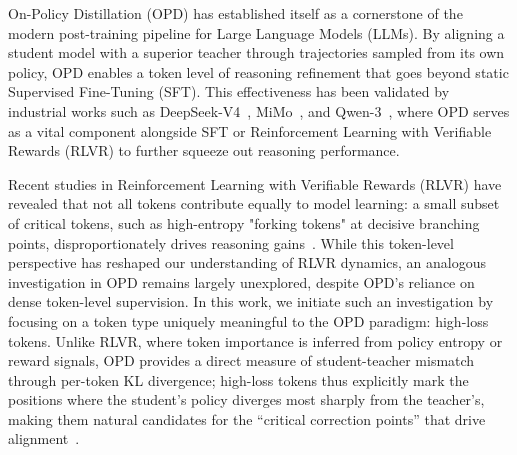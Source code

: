 
On-Policy Distillation (OPD) has established itself as a cornerstone of the modern post-training pipeline for Large Language Models (LLMs). By aligning a student model with a superior teacher through trajectories sampled from its own policy, OPD enables a token level of reasoning refinement that goes beyond static Supervised Fine-Tuning (SFT). This effectiveness has been validated by industrial works such as DeepSeek-V4~\cite{deepseekv4}, MiMo~\cite{xiao2026mimo}, and Qwen-3~\cite{qwen3technicalreport}, where OPD serves as a vital component alongside SFT or Reinforcement Learning with Verifiable Rewards (RLVR) to further squeeze out reasoning performance.



Recent studies in Reinforcement Learning with Verifiable Rewards (RLVR) have revealed that not all tokens contribute equally to model learning: a small subset of critical tokens, such as high-entropy "forking tokens" at decisive branching points, disproportionately drives reasoning gains~\cite{wang2025beyond}. While this token-level perspective has reshaped our understanding of RLVR dynamics, an analogous investigation in OPD remains largely unexplored, despite OPD's reliance on dense token-level supervision. In this work, we initiate such an investigation by focusing on a token type uniquely meaningful to the OPD paradigm: high-loss tokens. Unlike RLVR, where token importance is inferred from policy entropy or reward signals, OPD provides a direct measure of student-teacher mismatch through per-token KL divergence; high-loss tokens thus explicitly mark the positions where the student's policy diverges most sharply from the teacher's, making them natural candidates for the ``critical correction points'' that drive alignment~\cite{lu2025onpolicydistillation}. 

